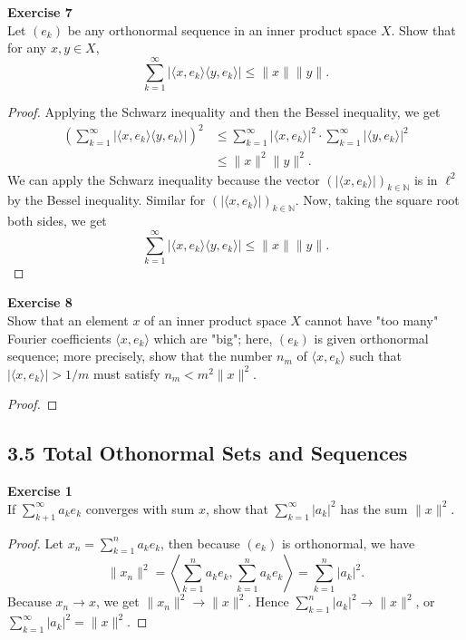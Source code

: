 \documentclass[12pt, a4paper]{article}
\theoremstyle{plain}
\newcommand{\N}{\mathbb{N}}
\newenvironment{exercise}[2][Exercise]
    { \begin{mdframed}[backgroundcolor=gray!20] \textbf{#1 #2} \\}
    {  \end{mdframed}}
\begin{document}
\begin{exercise}{7}
Let $(e_k)$ be any orthonormal sequence in an inner product space $X$. Show that for any $x,y\in X$, 
\[
\sum_{k=1}^{\infty}{|\langle{x,e_k}\rangle\langle{y,e_k}\rangle}|\leq \|x\|\|y\|.
\]
\end{exercise}
	\begin{proof}
	Applying the Schwarz inequality and then the Bessel inequality, we get
	\begin{align*}
	\left(\sum_{k=1}^{\infty}{|\langle{x,e_k}\rangle\langle{y,e_k}\rangle|}\right)^2 &\leq \sum_{k=1}^{\infty}{|\langle{x,e_k}\rangle|^2}\cdot\sum_{k=1}^{\infty}{|\langle{y,e_k}\rangle|^2}\\
	&\leq \|x\|^2\|y\|^2.
	\end{align*}
	We can apply the Schwarz inequality because the vector $(|\langle{x,e_k}\rangle|)_{k\in\N}$ is in $\ell^2$ by the Bessel inequality. Similar for $(|\langle{x,e_k}\rangle|)_{k\in\N}$. Now, taking the square root both sides, we get 
	\[
	\sum_{k=1}^{\infty}{|\langle{x,e_k}\rangle\langle{y,e_k}\rangle|}\leq \|x\|\|y\|.
	\]
	\end{proof}

\begin{exercise}{8}
Show that an element $x$ of an inner product space $X$ cannot have "too many" Fourier coefficients $\langle{x,e_k}\rangle$ which are "big"; here, $(e_k)$ is given orthonormal sequence; more precisely, show that the number $n_m$ of $\langle{x,e_k}\rangle$ such that $|\langle{x,e_k}\rangle|>1/m$ must satisfy $n_m<m^2\|x\|^2$.
\end{exercise}
	\begin{proof}
	
	\end{proof}

\subsection*{3.5 Total Othonormal Sets and Sequences}

\begin{exercise}{1}
If $\sum_{k+1}^{\infty}{a_ke_k}$ converges with sum $x$, show that $\sum_{k=1}^{\infty}{|a_k|^2}$ has the sum $\|x\|^2$.
\end{exercise}
	\begin{proof}
	Let $x_n=\sum_{k=1}^{n}{a_ke_k}$, then because $(e_k)$ is orthonormal, we have
	\[
	\|x_n\|^2 = \left\langle{\sum_{k=1}^{n}{a_ke_k},\sum_{k=1}^{n}{a_ke_k}}\right\rangle = \sum_{k=1}^{n}{|a_k|^2}.
	\]
	Because $x_n\rightarrow x$, we get $\|x_n\|^2\rightarrow \|x\|^2$. Hence $\sum_{k=1}^{n}{|a_k|^2}\rightarrow \|x\|^2$, or $\sum_{k=1}^{\infty}{|a_k|^2} = \|x\|^2$.
	\end{proof}
\end{document}
